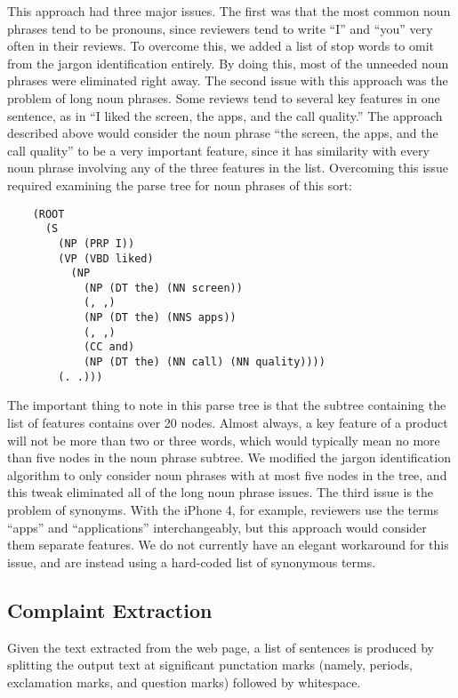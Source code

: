 \documentclass{article}
\begin{document}
This approach had three major issues.  The first was that the most common noun phrases tend to be pronouns, since reviewers tend to write ``I'' and ``you'' very often in their reviews.  To overcome this, we added a list of stop words to omit from the jargon identification entirely.  By doing this, most of the unneeded noun phrases were eliminated right away.  The second issue with this approach was the problem of long noun phrases.  Some reviews tend to several key features in one sentence, as in ``I liked the screen, the apps, and the call quality.''  The approach described above would consider the noun phrase ``the screen, the apps, and the call quality'' to be a very important feature, since it has similarity with every noun phrase involving any of the three features in the list.  Overcoming this issue required examining the parse tree for noun phrases of this sort:
\begin{verbatim}
	(ROOT
	  (S
	    (NP (PRP I))
	    (VP (VBD liked)
	      (NP
	        (NP (DT the) (NN screen))
	        (, ,)
	        (NP (DT the) (NNS apps))
	        (, ,)
	        (CC and)
	        (NP (DT the) (NN call) (NN quality))))
	    (. .)))
\end{verbatim}
The important thing to note in this parse tree is that the subtree containing the list of features contains over 20 nodes.  Almost always, a key feature of a product will not be more than two or three words, which would typically mean no more than five nodes in the noun phrase subtree.  We modified the jargon identification algorithm to only consider noun phrases with at most five nodes in the tree, and this tweak eliminated all of the long noun phrase issues.  The third issue is the problem of synonyms.  With the iPhone 4, for example, reviewers use the terms ``apps'' and ``applications'' interchangeably, but this approach would consider them separate features.  We do not currently have an elegant workaround for this issue, and are instead using a hard-coded list of synonymous terms.


\subsection{Complaint Extraction} %

Given the text extracted from the web page, a list of sentences is produced by
splitting the output text at significant punctation marks (namely, periods,
exclamation marks, and question marks) followed by whitespace.
\end{document}
